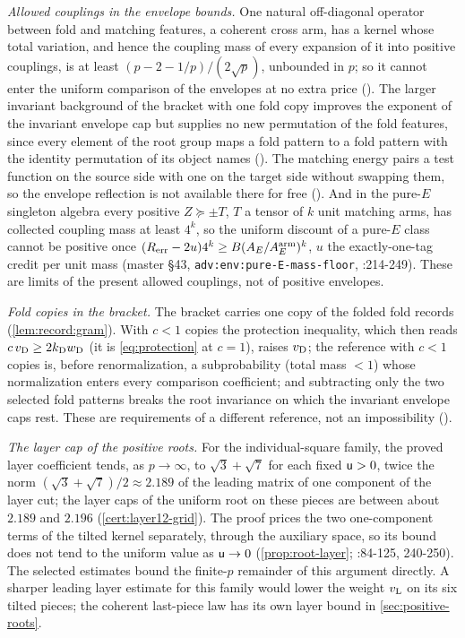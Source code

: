 \emph{Allowed couplings in the envelope bounds.} One natural off-diagonal operator
between fold and matching features, a coherent cross arm, has a kernel whose
total variation, and hence the coupling mass of every expansion of it into
positive couplings, is at least $(p-2-1/p)/(2\sqrt p)$, unbounded in $p$; so it
cannot enter the uniform comparison of the envelopes at no extra price
(). The
larger invariant background of the bracket with one fold copy improves the
exponent of the invariant envelope cap but supplies no new permutation of the
fold features, since every element of the root group maps a fold pattern to a
fold pattern with the identity permutation of its object names
(). The
matching energy pairs a test function on the source side with one on the target side without swapping them, so the envelope reflection is not available there for free
(). And in
the pure-$E$ singleton algebra every positive $Z\succeq\pm T$, $T$ a tensor of $k$
unit matching arms, has collected coupling mass at least $4^k$, so the uniform
discount of a pure-$E$ class cannot be positive once
$(R_{\rm err}-2u)4^k\ge B(A_E/A^{\rm arm}_E)^k$, $u$ the exactly-one-tag credit per
unit mass (master \S43, \texttt{adv:env:pure-E-mass-floor},
:214-249). These are
limits of the present allowed couplings, not of positive envelopes.

\emph{Fold copies in the bracket.} The bracket carries one copy of the folded
fold records (\cref{lem:record:gram}). With $c<1$ copies the protection
inequality, which then reads $c\,v_{\rm D}\ge2k_{\rm D}w_{\rm D}$ (it is
\eqref{eq:protection} at $c=1$), raises $v_{\rm D}$; the reference with $c<1$ copies is, before renormalization, a subprobability (total mass $<1$) whose normalization enters every comparison coefficient; and
subtracting only the two selected fold patterns breaks the root invariance on
which the invariant envelope caps rest. These are requirements of a different
reference, not an impossibility
().

\emph{The layer cap of the positive roots.} For the individual-square family,
the proved layer coefficient tends, as $p\to\infty$, to $\sqrt3+\sqrt7$ for each fixed $\mathsf u>0$, twice the norm
$(\sqrt3+\sqrt7)/2\approx2.189$ of the leading matrix of one component of the
layer cut; the layer caps of the uniform root on these pieces are between about
$2.189$ and $2.196$ (\cref{cert:layer12-grid}). The proof prices the two
one-component terms of the tilted kernel separately, through the auxiliary
space, so its bound does not tend to the uniform value as $\mathsf u\to0$
(\cref{prop:root-layer};
:84-125, 240-250).
The selected estimates bound the finite-$p$ remainder of this argument directly. A sharper
leading layer estimate for this family would lower the weight $v_{\rm L}$
on its six tilted pieces; the coherent last-piece law has its own layer
bound in \cref{sec:positive-roots}.

